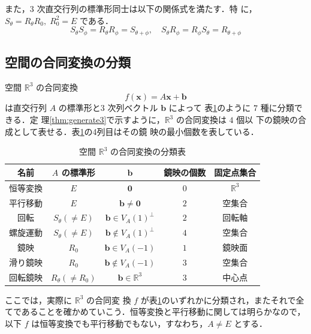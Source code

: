 \documentclass[11pt, uplatex, dvipdfmx, titlepage]{jsarticle}
\theoremstyle{definition}
\begin{document}
\begin{itemize}
\end{itemize}

また，$3$ 次直交行列の標準形同士は以下の関係式を満たす．特
に，$S_{\theta}= R_{\theta}R_{0}, \; R_0^2=E$ である．
\[
  S_{\theta} S_{\phi} = R_{\theta}R_{\phi}=S_{\theta+\phi}, \quad  
  S_{\theta}R_{\phi} = R_{\phi}S_{\theta} = R_{\theta+\phi}
\]

\newpage

\subsection{空間の合同変換の分類}

空間 $\mathbb{R}^3$ の合同変換
\[
  f(\bm{x}) = A\bm{x} + \bm{b}
\]
は直交行列 $A$ の標準形と$3$ 次列ベクトル $\bm{b}$ によって
表\ref{tab:classification3}のように $7$ 種に分類できる．定
理\ref{thm:generate3}で示すように，$\mathbb{R}^3$ の合同変換は $4$ 個以
下の鏡映の合成として表せる．表\ref{tab:classification3}の4列目はその鏡
映の最小個数を表している．

\begin{table}[h]
  \centering
  \begin{tabular}[h]{|c|c|c|c|c|}\hline
    名前 & $A$ の標準形 & $\bm{b}$ & 鏡映の個数 & 固定点集合\\ \hline
    恒等変換 & $E$ & $\bm{0}$ & 0 & $\mathbb{R}^3$\\ 
    平行移動 & $E$ & $\bm{b} \neq \bm{0}$ & $2$ & 空集合\\
    回転 & $S_{\theta} (\neq E)$ & $\bm{b} \in V_{A}(1)^{\perp}$  & $2$ & 回転軸\\
    螺旋運動 & $S_{\theta} (\neq E)$ & $\bm{b} \notin V_{A}(1)^{\perp}$ & $4$ &  空集合\\ 
    鏡映 & $R_{0}$ & $\bm{b} \in V_A(-1)$ & $1$ & 鏡映面\\
    滑り鏡映 & $R_{0}$ & $\bm{b} \notin V_A(-1)$ & $3$ & 空集合\\
    回転鏡映 & $R_{\theta} (\neq R_{0})$ & $\bm{b} \in \mathbb{R}^3$ & $3$ &  中心点\\ \hline    
  \end{tabular}
  \caption{空間 $\mathbb{R}^3$ の合同変換の分類表}
  \label{tab:classification3}
\end{table}

ここでは，実際に $\mathbb{R}^3$ の合同変
換 $f$ が表\ref{tab:classification3}のいずれかに分類され，またそれで全
てであることを確かめていこう．恒等変換と平行移動に関しては明らかなので，
以下 $f$ は恒等変換でも平行移動でもない，すなわち，$A \neq E$ とする．
\end{document}
